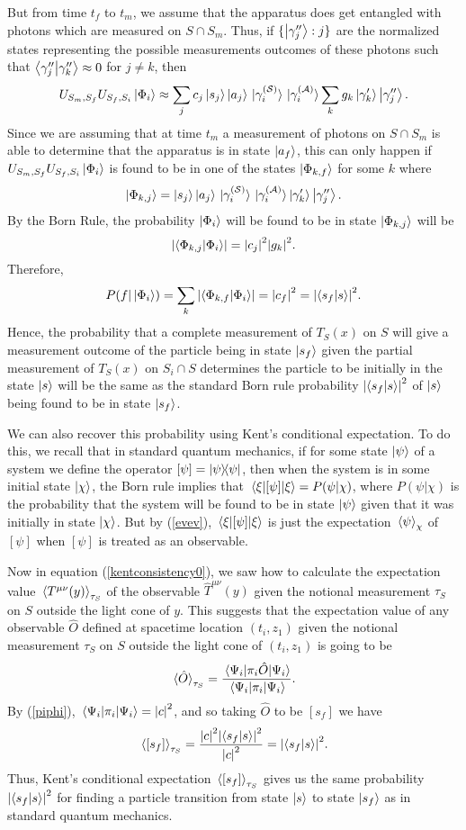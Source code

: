 But from time $t_f$ to $t_m$, we assume that the apparatus does get entangled with photons which are measured on $S\cap S_m$. Thus, if $\{\ket{\gamma_j^{\prime\prime}}:j\}$ are the normalized states representing the possible measurements outcomes of these photons such that $\ip{\gamma_j^{\prime\prime}}{\gamma_k^{\prime\prime}}\approx 0$ for $j\neq k$, then 
$$U_{S_m,S_f} U_{S_f,S_i}\ket{\Phi_{i}}\approx \sum_j c_j\ket{s_j}\ket{a_j}\ket*{\gamma_i^{(\mathcal{S})}}\ket*{\gamma_i^{(\mathcal{A})}}\sum_kg_k\ket{\gamma'_k}\ket{\gamma_j^{\prime\prime}}.$$
Since we are assuming that at time $t_m$ a measurement of photons on $S\cap S_m$ is able to determine that the apparatus is in state $\ket{a_f}$, this can only happen if $U_{S_m,S_f} U_{S_f,S_i}\ket{\Phi_{i}}$ is found to be in one of the states $\ket{\Phi_{k,f}}$ for some $k$ where
$$\ket{\Phi_{k,j}}=\ket{s_j}\ket{a_j}\ket*{\gamma_i^{(\mathcal{S})}}\ket*{\gamma_i^{(\mathcal{A})}}\ket{\gamma'_k}\ket{\gamma_j^{\prime\prime}}.$$
By the Born Rule, the probability $\ket{\Phi_i}$ will be found to be in state $\ket{\Phi_{k,j}}$ will be
$$\abs{\ip{\Phi_{k,j}}{\Phi_i}}=\abs{c_j}^2\abs{g_k}^2.$$
Therefore,
$$P(f|\ket{\Phi_i})=\sum_k \abs{\ip{\Phi_{k,f}}{\Phi_i}}=\abs{c_f}^2=\abs{\ip{s_f}{s}}^2.$$
Hence, the probability that a complete measurement of $T_S(x)$ on $S$ will give a measurement outcome of the particle being in state $\ket{s_f}$ given the partial measurement of $T_S(x)$ on $S_i\cap S$ determines the particle to be initially in the state $\ket{s}$ will be the same as the standard Born rule probability $\abs{\ip{s_f}{s}}^2$ of $\ket{s}$ being found to be in state $\ket{s_f}$.

We can also recover this probability using Kent's conditional expectation. To do this, we recall that in standard quantum mechanics, if for some state $\ket{\psi}$ of a system we define the operator $[\psi]=\dyad{\psi}$, then when the system is in some initial state $\ket{\chi}$, the Born rule implies that $\ev{[\psi]}{\xi}=P(\psi|\chi)$, where $P(\psi|\chi)$ is the probability that the system will be found to be in state $\ket{\psi}$ given that it was initially in state $\ket{\chi}$. But by (\ref{evev}),  $\ev{[\psi]}{\xi}$ is just the expectation $\ev*{\psi}_\chi$ of $[\psi]$ when $[\psi]$ is treated as an observable. 

Now in equation (\ref{kentconsistency0}), we saw how to calculate the expectation value $\ev*{T^{\mu\nu}(y)}_{\tau_S}$ of the observable $\hat{T}^{\mu\nu}(y)$ given the notional measurement $\tau_S$ on $S$ outside the light cone of $y$. This suggests that the expectation value of any observable $\hat{O}$ defined at spacetime location $(t_i,z_1)$ given the notional measurement $\tau_S$ on $S$ outside the light cone of $(t_i,z_1)$ is going to be
$$\ev*{\hat{O}}_{\tau_S}=\frac{\ev*{\pi_i\hat{O}}{\Psi_i}}{\ev*{\pi_i}{\Psi_i}}.$$ 
By (\ref{piphi}), $\ev*{\pi_i}{\Psi_i}=\abs{c}^2$, and so taking $\hat{O}$ to be $[s_f]$ we have 
$$ \ev*{[s_f]}_{\tau_S}=\frac{\abs{c}^2\abs{\ip{s_f}{s}}^2}{\abs{c}^2}=\abs{\ip{s_f}{s}}^2.$$
Thus, Kent's conditional expectation $\ev*{[s_f]}_{\tau_S}$ gives us the same probability $\abs{\ip{s_f}{s}}^2$ for finding a particle transition from state $\ket{s}$ to state $\ket{s_f}$ as in standard quantum mechanics.



